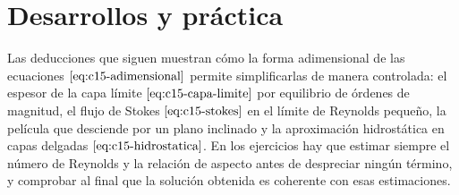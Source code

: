\documentclass[10pt,openany]{book}
\begin{document}
\section{Desarrollos y práctica}

Las deducciones que siguen muestran cómo la forma adimensional de las ecuaciones \(\eqref{eq:c15-adimensional}\) permite simplificarlas de manera controlada: el espesor de la capa límite \(\eqref{eq:c15-capa-limite}\) por equilibrio de órdenes de magnitud, el flujo de Stokes \(\eqref{eq:c15-stokes}\) en el límite de Reynolds pequeño, la película que desciende por un plano inclinado y la aproximación hidrostática en capas delgadas \(\eqref{eq:c15-hidrostatica}\). En los ejercicios hay que estimar siempre el número de Reynolds y la relación de aspecto antes de despreciar ningún término, y comprobar al final que la solución obtenida es coherente con esas estimaciones.
\end{document}
